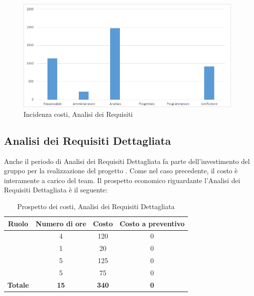 \begin{figure}[H]
	\centering
	\includegraphics[scale=0.6]{img/8-1.png}
	\caption{Incidenza costi, Analisi dei Requisiti}
\end{figure}

\newpage
\subsection{Analisi dei Requisiti Dettagliata}
Anche il periodo di Analisi dei Requisiti Dettagliata fa parte dell'investimento del gruppo \textit{\gruppo} per la realizzazione del progetto \progetto. Come nel caso precedente, il costo è interamente a carico del team. Il prospetto economico riguardante l'Analisi dei Requisiti Dettagliata è il seguente:


\begin{table}[H]
	\begin{center}
		\begin{tabular}{|c|c|c|c|}
			\hline
			\textbf{Ruolo}	& \textbf{Numero di ore} & \textbf{Costo} & \textbf{Costo a preventivo}\\
			\hline
			\Res	&	4  &	120 &  0	\\
			\hline
			\Amm	&	1  &	20 &  0	\\
			\hline
			\Ana	&	5  &	125 &  0	\\
			\hline
			\Ver	&	5  &	75	&  0	\\
			\hline
			\textbf{Totale}  &	\textbf{15}	&  \textbf{340}	 &  \textbf{0}	\\
			\hline
		\end{tabular}
	\end{center}
	\caption{Prospetto dei costi, Analisi dei Requisiti Dettagliata }
\end{table}

